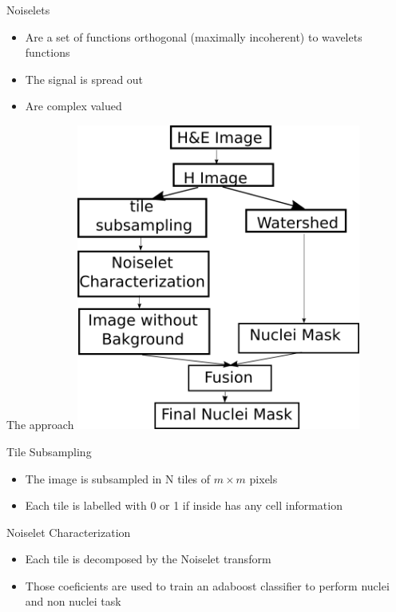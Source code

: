 \documentclass[usenames,dvipsnames]{beamer}
\begin{document}
\begin{frame}{Noiselets}
\begin{itemize}
\item Are a set of functions orthogonal (maximally incoherent) to wavelets functions
\pause
\item The signal is spread out
\pause
\item Are complex valued


\end{itemize}

\end{frame}


\begin{frame}{The approach}
\centering \includegraphics[width=0.7\textwidth]{images/Esquema.png}
\end{frame}

\begin{frame}{Tile Subsampling}
\begin{itemize}
\item The image is subsampled in N tiles of $m \times m$ pixels
\pause
\item Each tile is labelled with 0 or 1 if inside has any cell information

\end{itemize}

\end{frame}

\begin{frame}{Noiselet Characterization}
\begin{itemize}
\item Each tile is decomposed by the Noiselet transform
\pause
\item Those coeficients are used to train an adaboost classifier to perform nuclei and non nuclei task

\end{itemize}
\end{frame}
\end{document}
